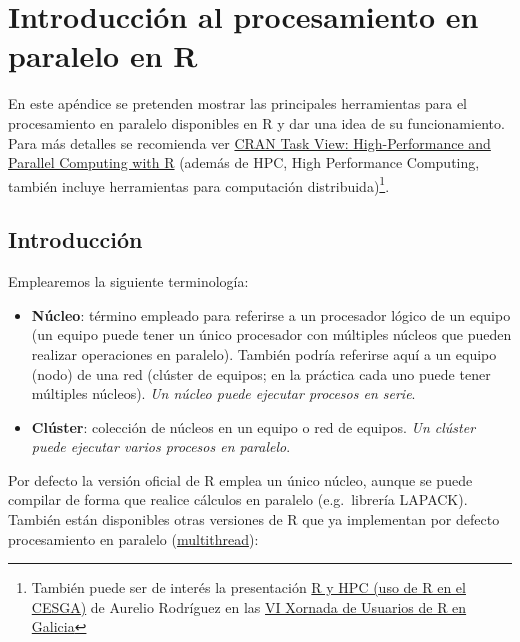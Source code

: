 \documentclass[
]{book}
\theoremstyle{definition}
\theoremstyle{definition}
\theoremstyle{definition}
\theoremstyle{remark}
\begin{document}
\hypertarget{introducciuxf3n-al-procesamiento-en-paralelo-en-r}{%
\chapter{Introducción al procesamiento en paralelo en R}\label{introducciuxf3n-al-procesamiento-en-paralelo-en-r}}

En este apéndice se pretenden mostrar las principales herramientas para el procesamiento en paralelo disponibles en R y dar una idea de su funcionamiento.
Para más detalles se recomienda ver \href{https://cran.r-project.org/view=HighPerformanceComputing}{CRAN Task View: High-Performance and Parallel Computing with R}
(además de HPC, High Performance Computing, también incluye herramientas
para computación distribuida)\footnote{También puede ser de interés la presentación \href{https://www.r-users.gal/sites/default/files/10_aurelio_rodriguez.pdf}{R y HPC (uso de R en el CESGA)} de Aurelio Rodríguez en las \href{https://www.r-users.gal/pagina/programa-2018}{VI Xornada de Usuarios de R en Galicia}}.

\hypertarget{introducciuxf3n-2}{%
\section{Introducción}\label{introducciuxf3n-2}}

Emplearemos la siguiente terminología:

\begin{itemize}
\item
  \textbf{Núcleo}: término empleado para referirse a un procesador lógico de un equipo
  (un equipo puede tener un único procesador con múltiples núcleos que pueden
  realizar operaciones en paralelo). También podría referirse aquí a un
  equipo (nodo) de una red (clúster de equipos; en la práctica cada uno puede tener
  múltiples núcleos). \emph{Un núcleo puede ejecutar procesos en serie}.
\item
  \textbf{Clúster}: colección de núcleos en un equipo o red de equipos.
  \emph{Un clúster puede ejecutar varios procesos en paralelo}.
\end{itemize}

Por defecto la versión oficial de R emplea un único núcleo, aunque se puede compilar
de forma que realice cálculos en paralelo (e.g.~librería LAPACK).
También están disponibles otras versiones de R que ya implementan por defecto
procesamiento en paralelo (\href{https://mran.revolutionanalytics.com/documents/rro/multithread}{multithread}):
\end{document}

